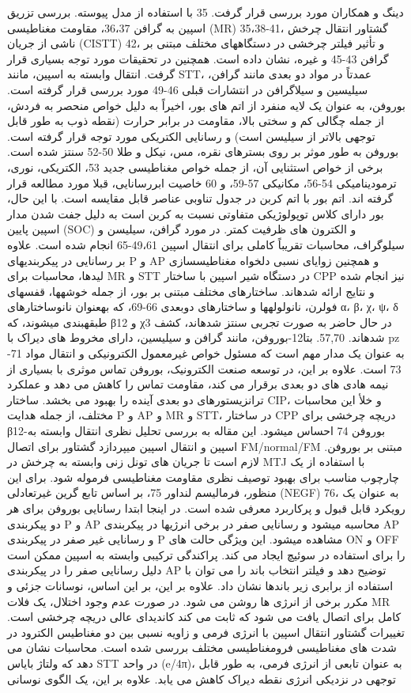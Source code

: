 دینگ و همکاران مورد بررسی قرار گرفت. 35 با استفاده از مدل پیوسته. بررسی تزریق اسپین به گرافن 36،37، مقاومت مغناطیسی (MR) 35،38-41، گشتاور انتقال چرخش ناشی از جریان (CISTT) 42، و تأثیر فیلتر چرخشی در دستگاههای مختلف مبتنی بر گرافن 43-45 و غیره، نشان داده است. همچنین در تحقیقات مورد توجه بسیاری قرار گرفت. انتقال وابسته به اسپین، مانند STT، عمدتاً در مواد دو بعدی مانند گرافن، سیلیسین و سیلاگرافن در انتشارات قبلی 46-49 مورد بررسی قرار گرفته است. بوروفن، به عنوان یک لایه منفرد از اتم های بور، اخیراً به دلیل خواص منحصر به فردش، از جمله چگالی کم و سختی بالا، مقاومت در برابر حرارت (نقطه ذوب به طور قابل توجهی بالاتر از سیلیسن است) و رسانایی الکتریکی مورد توجه قرار گرفته است. بوروفن به طور موثر بر روی بسترهای نقره، مس، نیکل و طلا 50-52 سنتز شده است. برخی از خواص استثنایی آن، از جمله خواص مغناطیسی جدید 53، الکتریکی، نوری، ترمودینامیکی 54-56، مکانیکی 57-59، و 60 خاصیت ابررسانایی، قبلا مورد مطالعه قرار گرفته اند. اتم بور با اتم کربن در جدول تناوبی عناصر قابل مقایسه است. با این حال، بور دارای کلاس توپولوژیکی متفاوتی نسبت به کربن است به دلیل جفت شدن مدار اسپین پایین (SOC) و الکترون های ظرفیت کمتر. در مورد گرافن، سیلیسن و سیلوگراف، محاسبات تقریباً کاملی برای انتقال اسپین 49،61-65 انجام شده است. علاوه بر رسانایی در پیکربندیهای P و AP و همچنین زوایای نسبی دلخواه مغناطیسسازی لیدها، محاسبات برای MR و STT در دستگاه شیر اسپین با ساختار CPP نیز انجام شده و نتایج ارائه شدهاند. ساختارهای مختلف مبتنی بر بور، از جمله خوشهها، قفسهای فولرن، نانولولهها و ساختارهای دوبعدی 66-69، که بهعنوان نانوساختارهای α، β، χ، ψ، δ طبقهبندی میشوند، که β12 و χ3 در حال حاضر به صورت تجربی سنتز شدهاند، کشف شدهاند. 57,70. بتا12-بوروفن، مانند گرافن و سیلیسین، دارای مخروط های دیراک با pz به عنوان یک مدار مهم است که مسئول خواص غیرمعمول الکترونیکی و انتقال مواد 71-73 است. علاوه بر این، در توسعه صنعت الکترونیک، بوروفن تماس موثری با بسیاری از نیمه هادی های دو بعدی برقرار می کند، مقاومت تماس را کاهش می دهد و عملکرد ترانزیستورهای دو بعدی آینده را بهبود می بخشد. ساختار CIP، و خلأ این محاسبات مختلف، از جمله هدایت P و AP و MR و STT، در ساختار CPP دریچه چرخشی برای β12-بوروفن 74 احساس میشود. این مقاله به بررسی تحلیل نظری انتقال وابسته به اسپین و انتقال اسپین میپردازد گشتاور برای اتصال FM/normal/FM مبتنی بر بوروفن. لازم است تا جریان های تونل زنی وابسته به چرخش در MTJ با استفاده از یک چارچوب مناسب برای بهبود توصیف نظری مقاومت مغناطیسی فرموله شود. برای این منظور، فرمالیسم لنداور 75، بر اساس تابع گرین غیرتعادلی (NEGF) 76، به عنوان یک رویکرد قابل قبول و پرکاربرد معرفی شده است. در اینجا ابتدا رسانایی بوروفن برای هر دو پیکربندی P و AP محاسبه میشود و رسانایی صفر در برخی انرژیها در پیکربندی AP و رسانایی غیر صفر در پیکربندی P مشاهده میشود. این ویژگی حالت های ON و OFF را برای استفاده در سوئیچ ایجاد می کند. پراکندگی ترکیبی وابسته به اسپین ممکن است دلیل رسانایی صفر را در پیکربندی AP توضیح دهد و فیلتر انتخاب باند را می توان با استفاده از برابری زیر باندها نشان داد. علاوه بر این، بر این اساس، نوسانات جزئی و مکرر برخی از انرژی ها روشن می شود. در صورت عدم وجود اختلال، یک فلات MR کامل برای اتصال یافت می شود که ثابت می کند کاندیدای عالی دریچه چرخشی است. تغییرات گشتاور انتقال اسپین با انرژی فرمی و زاویه نسبی بین دو مغناطیس الکترود در شدت های مغناطیسی فرومغناطیسی مختلف بررسی شده است. محاسبات نشان می دهد که ولتاژ بایاس STT در واحد (e/4π)، به عنوان تابعی از انرژی فرمی، به طور قابل توجهی در نزدیکی انرژی نقطه دیراک کاهش می یابد. علاوه بر این، یک الگوی نوسانی 